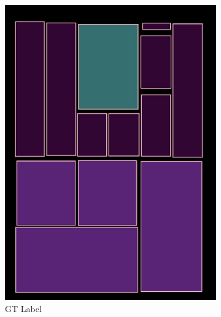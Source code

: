 \documentclass[aspectratio=1610]{beamer}
\begin{document}
\begin{frame}
\begin{figure}
\begin{subfigure}{.25\textwidth}
  \includegraphics[width=0.99\linewidth, clip=true, trim = 0mm 0mm 0mm 0mm]{figures/bbox/kvtooQ3.jpg}
  \caption{GT Label}
\end{subfigure}%
\begin{subfigure}{.25\textwidth}
  \centering

\end{subfigure}
\end{figure}
\end{frame}
\end{document}
